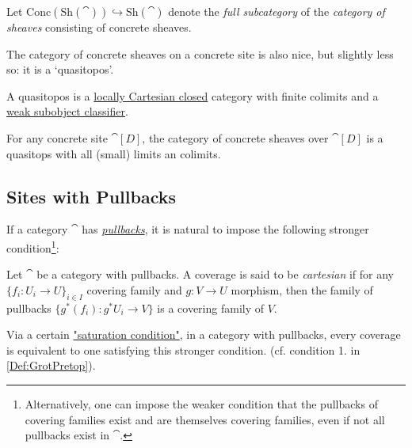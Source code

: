 \documentclass[a4paper,11pt]{article}  %
\begin{document}
\begin{definition} \label{ConcSheafOnConcSite}
Let $\mathrm{Conc}(\mathrm{Sh}(\cat)) \hookrightarrow \mathrm{Sh}(\cat)$ denote the \emph{full subcategory} of the \emph{category of sheaves} consisting of concrete sheaves.
\end{definition}



The category of concrete sheaves on a concrete site is also nice, but slightly less so: it is a ‘quasitopos’. 

\begin{definition}
A quasitopos is a \href{https://ncatlab.org/nlab/show/locally+cartesian+closed+category#definition}{locally Cartesian closed} category with finite colimits and a \href{https://ncatlab.org/nlab/show/subobject+classifier#weak_subobject_classifier}{weak subobject classifier}.
\end{definition}

\begin{theorem}
For any concrete site $\cat[D]$, the category of concrete sheaves over $\cat[D]$ is a quasitops with all (small) limits an colimits.
\end{theorem}

\subsection{Sites with Pullbacks}
%
If a category $\cat$ has \emph{\href{https://ncatlab.org/nlab/show/pullback}{pullbacks}}, it is natural to impose the following stronger condition\footnote{Alternatively, one can impose the weaker condition that the pullbacks of covering families exist and are themselves covering families, even if not all pullbacks exist in $\cat$.}:

\begin{definition}\label{Def:CartesianCover}
	Let $\cat$ be a category with pullbacks.
	A coverage is said to be \emph{cartesian} if for any \(\{f_i : U_i \to U\}_{i \in I}\)  covering family and \(g : V \to U\) morphism, then the family of pullbacks \(\{g^*(f_i) : g^*U_i \to V\}\) is a covering family of \(V\).
\end{definition}
Via a certain \href{https://ncatlab.org/nlab/show/coverage\#saturation_conditions}{"saturation condition"}, in a category with pullbacks, every coverage is equivalent to one satisfying this stronger condition. (cf. condition 1. in \cref{Def:GrotPretop}).
\end{document}
